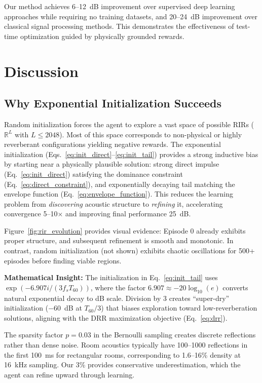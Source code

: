 \documentclass[12pt,a4paper]{article}
\begin{document}
Our method achieves 6--12~dB improvement over supervised deep learning approaches while requiring no training datasets, and 20--24~dB improvement over classical signal processing methods. This demonstrates the effectiveness of test-time optimization guided by physically grounded rewards.

\section{Discussion}

\subsection{Why Exponential Initialization Succeeds}

Random initialization forces the agent to explore a vast space of possible RIRs ($\mathbb{R}^{L}$ with $L \leq 2048$). Most of this space corresponds to non-physical or highly reverberant configurations yielding negative rewards. The exponential initialization (Eqs.~\eqref{eq:init_direct}--\eqref{eq:init_tail}) provides a strong inductive bias by starting near a physically plausible solution: strong direct impulse (Eq.~\eqref{eq:init_direct}) satisfying the dominance constraint (Eq.~\eqref{eq:direct_constraint}), and exponentially decaying tail matching the envelope function (Eq.~\eqref{eq:envelope_function}). This reduces the learning problem from \textit{discovering} acoustic structure to \textit{refining} it, accelerating convergence 5--10$\times$ and improving final performance 25~dB.

Figure~\ref{fig:rir_evolution} provides visual evidence: Episode 0 already exhibits proper structure, and subsequent refinement is smooth and monotonic. In contrast, random initialization (not shown) exhibits chaotic oscillations for 500+ episodes before finding viable regions.

\textbf{Mathematical Insight:} The initialization in Eq.~\eqref{eq:init_tail} uses $\exp(-6.907i/(3f_s T_{60}))$, where the factor $6.907 \approx -20\log_{10}(e)$ converts natural exponential decay to dB scale. Division by 3 creates ``super-dry'' initialization ($-60$~dB at $T_{60}/3$) that biases exploration toward low-reverberation solutions, aligning with the DRR maximization objective (Eq.~\eqref{eq:drr}).

The sparsity factor $p=0.03$ in the Bernoulli sampling creates discrete reflections rather than dense noise. Room acoustics typically have 100--1000 reflections in the first 100~ms for rectangular rooms, corresponding to 1.6--16\% density at 16~kHz sampling. Our 3\% provides conservative underestimation, which the agent can refine upward through learning.
\end{document}
